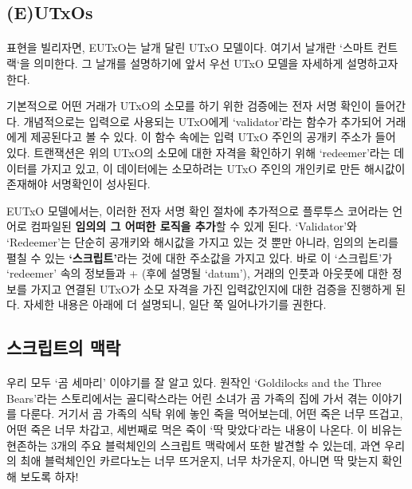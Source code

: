 \documentclass[a4paper, 11pt]{article}
\begin{document}
    \subsection{(E)UTxOs}
    
    \paragraph{} 표현을 빌리자면, EUTxO는 날개 달린 UTxO 모델이다. 여기서 날개란 `스마트 컨트랙`을 의미한다. 그 날개를 설명하기에 앞서 우선 UTxO 모델을 자세하게 설명하고자 한다. 
    
    기본적으로 어떤 거래가 UTxO의 소모를 하기 위한 검증에는 전자 서명 확인이 들어간다. 개념적으로는 입력으로 사용되는 UTxO에게 `validator'라는 함수가 추가되어 거래에게 제공된다고 볼 수 있다. 이 함수 속에는 입력 UTxO 주인의 공개키 주소가 들어 있다. 트랜잭션은 위의 UTxO의 소모에 대한 자격을 확인하기 위해 `redeemer'라는 데이터를 가지고 있고, 이 데이터에는 소모하려는 UTxO 주인의 개인키로 만든 해시값이 존재해야 서명확인이 성사된다.
    
    EUTxO 모델에서는, 이러한 전자 서명 확인 절차에 추가적으로 플루투스 코어라는 언어로 컴파일된 \textbf{임의의 그 어떠한 로직을 추가}할 수 있게 된다. `Validator'와 `Redeemer'는 단순히 공개키와 해시값을 가지고 있는 것 뿐만 아니라, 임의의 논리를 펼칠 수 있는 \textbf{`스크립트'}라는 것에 대한 주소값을 가지고 있다. 바로 이 `스크립트'가 `redeemer' 속의 정보들과 + (후에 설명될 `datum'), 거래의 인풋과 아웃풋에 대한 정보를 가지고 연결된 UTxO가 소모 자격을 가진 입력값인지에 대한 검증을 진행하게 된다. 자세한 내용은 아래에 더 설명되니, 일단 쭉 일어나가기를 권한다.

    \subsection{스크립트의 맥락}

    \paragraph{} 우리 모두 `곰 세마리' 이야기를 잘 알고 있다. 원작인 `Goldilocks and the Three Bears'라는 스토리에서는 골디락스라는 어린 소녀가 곰 가족의 집에 가서 겪는 이야기를 다룬다. 거기서 곰 가족의 식탁 위에 놓인 죽을 먹어보는데, 어떤 죽은 너무 뜨겁고, 어떤 죽은 너무 차갑고, 세번째로 먹은 죽이 `딱 맞았다'라는 내용이 나온다. 이 비유는 현존하는 3개의 주요 블럭체인의 스크립트 맥락에서 또한 발견할 수 있는데, 과연 우리의 최애 블럭체인인 카르다노는 너무 뜨거운지, 너무 차가운지, 아니면 딱 맞는지 확인해 보도록 하자!
    
\end{document}
